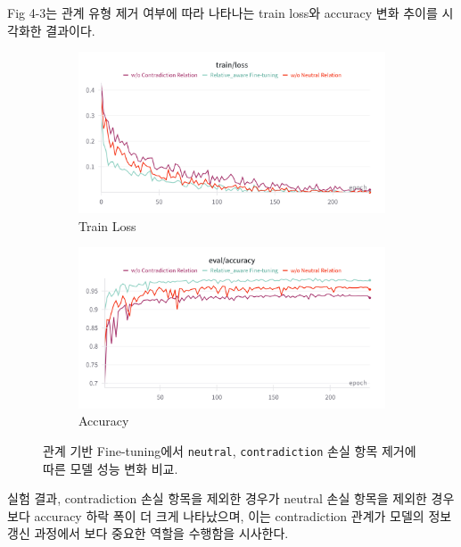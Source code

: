 \documentclass[a4paper,fleqn]{cas-sc}
\begin{document}
Fig 4-3는 관계 유형 제거 여부에 따라 나타나는 train loss와 accuracy 변화 추이를 시각화한 결과이다. 
\begin{figure}[htbp]
    \centering
    \begin{subfigure}[b]{0.48\textwidth}
        \centering
        \includegraphics[width=\textwidth]{2_train_loss.png}
        \caption{Train Loss}
        \label{fig:neutral_only}
    \end{subfigure}
    \hspace{0.02\textwidth}
    \begin{subfigure}[b]{0.48\textwidth}
        \centering
        \includegraphics[width=\textwidth]{2_accuracy.png}
        \caption{Accuracy}
        \label{fig:both_relations}
    \end{subfigure}
    \caption{관계 기반 Fine-tuning에서 \texttt{neutral}, \texttt{contradiction} 손실 항목 제거에 따른 모델 성능 변화 비교.}
    \label{fig:relation_ablation}
\end{figure}

실험 결과, contradiction 손실 항목을 제외한 경우가 neutral 손실 항목을 제외한 경우보다 accuracy 하락 폭이 더 크게 나타났으며, 이는 contradiction 관계가 모델의 정보 갱신 과정에서 보다 중요한 역할을 수행함을 시사한다.
\end{document}
